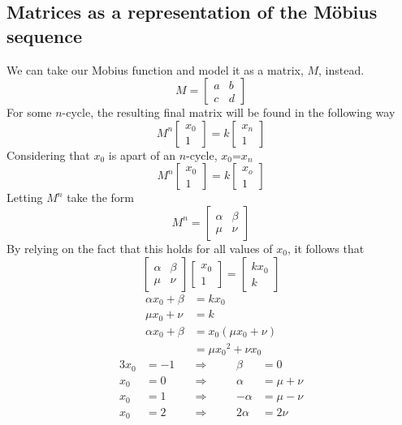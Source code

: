 \documentclass[12pt]{article}
\begin{document}
\subsection{Matrices as a representation of the Möbius sequence}
We can take our Mobius function and model it as a matrix, $M$, instead.
\[M=\begin{bmatrix}
	a & b \\
	c & d
\end{bmatrix}\]
For some $n$-cycle, the resulting final matrix will be found in the following way
\[M^n \begin{bmatrix} x_0 \\ 1 \end{bmatrix} = k \begin{bmatrix} x_n \\ 1 \end{bmatrix}\]
Considering that $x_0$ is apart of an $n$-cycle, $x_0$=$x_n$
\[M^n \begin{bmatrix} x_0 \\ 1 \end{bmatrix} = k \begin{bmatrix} x_o \\ 1 \end{bmatrix}\]
Letting $M^n$ take the form
\[M^n = \begin{bmatrix} \alpha & \beta \\ \mu & \nu \end{bmatrix}\]
By relying on the fact that this holds for all values of $x_0$, it follows that
\[\begin{bmatrix} \alpha & \beta \\ \mu & \nu \end{bmatrix}\begin{bmatrix} x_0 \\ 1 \end{bmatrix}=\begin{bmatrix} kx_0 \\ k \end{bmatrix}\]
\begin{align*}
	\alpha x_0+\beta & =kx_0                \\
	\mu x_0+\nu      & = k                  \\
	\alpha x_0+\beta & =x_0(\mu x_0+\nu)    \\
	                 & =\mu {x_0}^2+\nu x_0
\end{align*}
\begin{alignat*}{3}
	x_0 & =-1 & \quad\Longrightarrow\quad &  & \beta   & = 0       \\
	x_0 & =0  & \quad\Longrightarrow\quad &  & \alpha  & = \mu+\nu \\
	x_0 & =1  & \quad\Longrightarrow\quad &  & -\alpha & = \mu-\nu \\
	x_0 & =2  & \quad\Longrightarrow\quad &  & 2\alpha & = 2\nu
\end{alignat*}
\end{document}

